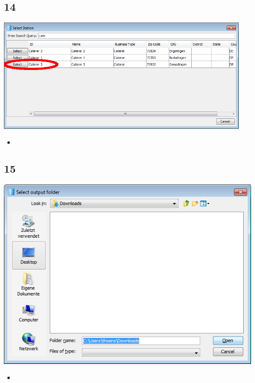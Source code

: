 \documentclass{beamer}
\begin{document}
\subsection{14}
\begin{frame}
	\begin{center}
  		\includegraphics[width=0.95\textwidth]{14.png}
	\end{center}
	\begin{itemize}
		\item
	\end{itemize}
\end{frame}

\subsection{15}
\begin{frame}
	\begin{center}
  		\includegraphics[height=0.5\textheight]{15.png}
	\end{center}
	\begin{itemize}
		\item
	\end{itemize}
\end{frame}
\end{document}
